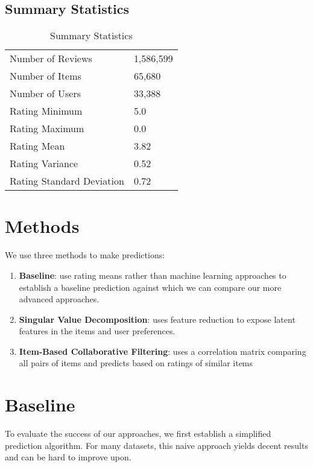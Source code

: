 \documentclass[12pt]{article}
\begin{document}
\subsection{Summary Statistics}

\begin{table}[ht!]
\centering
\caption{Summary Statistics}
\begin{tabular}{ll}
\hline
Number of Reviews         & 1,586,599 \\
Number of Items           & 65,680    \\
Number of Users           & 33,388    \\
Rating Minimum            & 5.0       \\
Rating Maximum            & 0.0       \\
Rating Mean               & 3.82      \\
Rating Variance           & 0.52      \\
Rating Standard Deviation & 0.72      \\ \hline
\end{tabular}
\end{table}

\section{Methods}
We use three methods to make predictions:

\begin{enumerate}
  \item \textbf{Baseline}: use rating means rather than machine learning approaches to establish a baseline prediction against which we can compare our more advanced approaches.
  \item \textbf{Singular Value Decomposition}: uses feature reduction to expose latent features in the items and user preferences.
  \item \textbf{Item-Based Collaborative Filtering}: uses a correlation matrix comparing all pairs of items and predicts based on ratings of similar items
\end{enumerate}

\section{Baseline}
To evaluate the success of our approaches, we first establish a simplified prediction algorithm. For many datasets, this naive approach yields decent results and can be hard to improve upon.
\end{document}
